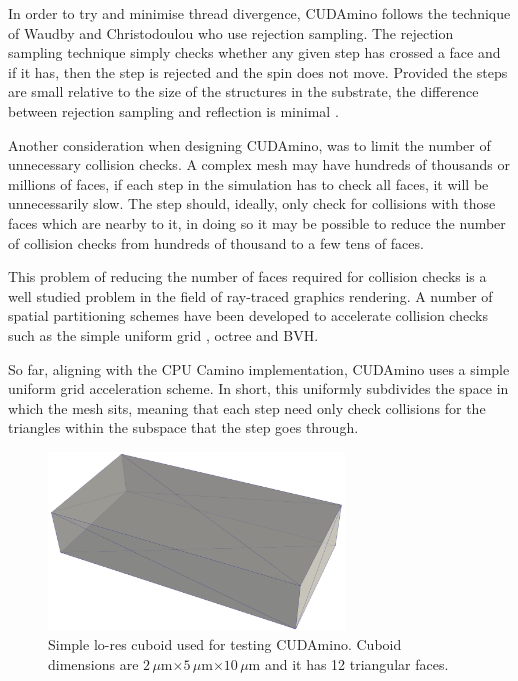 In order to try and minimise thread divergence, CUDAmino follows the technique of Waudby and Christodoulou \cite{Waudby2011} who use rejection sampling.
The rejection sampling technique simply checks whether any given step has crossed a face and if it has, then the step is rejected and the spin does not move.
Provided the steps are small relative to the size of the structures in the substrate, the difference between rejection sampling and reflection is minimal \cite{Johannesson1996}.

Another consideration when designing CUDAmino, was to limit the number of unnecessary collision checks.
A complex mesh may have hundreds of thousands or millions of faces, if each step in the simulation has to check all faces, it will be unnecessarily slow.
The step should, ideally, only check for collisions with those faces which are nearby to it, in doing so it may be possible to reduce the number of collision checks from hundreds of thousand to a few tens of faces.

This problem of reducing the number of faces required for collision checks is a well studied problem in the field of ray-traced graphics rendering.
A number of spatial partitioning schemes have been developed to accelerate collision checks  such as the simple uniform grid \cite{Fujimoto1986,Amanatides1987}, octree \cite{Fujimoto1986} and \ac{BVH}\cite{Kay1986}. 

So far, aligning with the \ac{CPU} Camino implementation, CUDAmino uses a simple uniform grid acceleration scheme. In short, this uniformly subdivides the space in which the mesh sits, meaning that each step need only check collisions for the triangles within the subspace that the step goes through.

\begin{figure}[t]
  \centering
  \includegraphics[width=0.7\textwidth]{figures/cudamino/cuboid_lores.png}
  \caption[Simple lo-res cuboid used for testing CUDAmino.]{Simple lo-res cuboid used for testing CUDAmino. Cuboid dimensions are $2\,\mu$m$\times5\,\mu$m$\times10\,\mu$m and it has 12 triangular faces.}
  \label{fig:cudamino_cuboid}
\end{figure}

